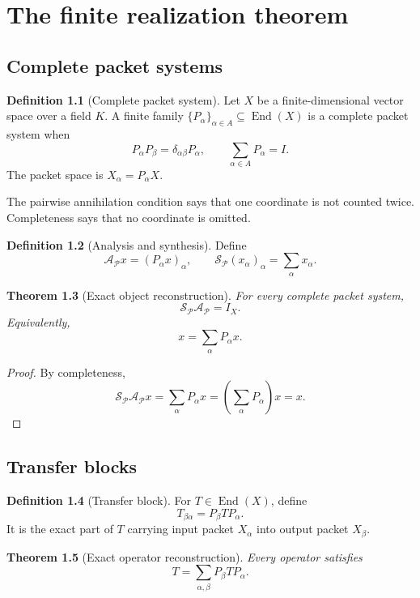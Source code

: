 \documentclass[11pt,oneside]{book}
\newtheorem{theorem}{Theorem}[chapter]
\theoremstyle{definition}
\newtheorem{definition}[theorem]{Definition}
\theoremstyle{remark}
\newcommand{\Id}{I}
\newcommand{\Acal}{\mathcal A}
\newcommand{\Scal}{\mathcal S}
\begin{document}
\chapter{The finite realization theorem}\label{ch:core}

\section{Complete packet systems}
\begin{definition}[Complete packet system]
Let $X$ be a finite-dimensional vector space over a field $K$. A finite family $\{P_\alpha\}_{\alpha\in A}\subseteq\operatorname{End}(X)$ is a complete packet system when
\[
P_\alpha P_\beta=\delta_{\alpha\beta}P_\alpha,
\qquad
\sum_{\alpha\in A}P_\alpha=\Id.
\]
The packet space is $X_\alpha=P_\alpha X$.
\end{definition}

The pairwise annihilation condition says that one coordinate is not counted twice. Completeness says that no coordinate is omitted.

\begin{definition}[Analysis and synthesis]
Define
\[
\Acal_{\mathcal P}x=(P_\alpha x)_\alpha,
\qquad
\Scal_{\mathcal P}(x_\alpha)_\alpha=\sum_\alpha x_\alpha.
\]
\end{definition}

\begin{theorem}[Exact object reconstruction]\label{thm:object-reconstruction}
For every complete packet system,
\[
\boxed{\Scal_{\mathcal P}\Acal_{\mathcal P}=\Id_X.}
\]
Equivalently,
\[
\boxed{x=\sum_\alpha P_\alpha x.}
\]
\end{theorem}

\begin{proof}
By completeness,
\[
\Scal_{\mathcal P}\Acal_{\mathcal P}x
=\sum_\alpha P_\alpha x
=\left(\sum_\alpha P_\alpha\right)x
=x.
\]
\end{proof}

\section{Transfer blocks}
\begin{definition}[Transfer block]
For $T\in\operatorname{End}(X)$, define
\[
T_{\beta\alpha}=P_\beta T P_\alpha.
\]
It is the exact part of $T$ carrying input packet $X_\alpha$ into output packet $X_\beta$.
\end{definition}

\begin{theorem}[Exact operator reconstruction]\label{thm:operator-reconstruction}
Every operator satisfies
\[
\boxed{T=\sum_{\alpha,\beta}P_\beta T P_\alpha.}
\]
\end{theorem}
\end{document}
